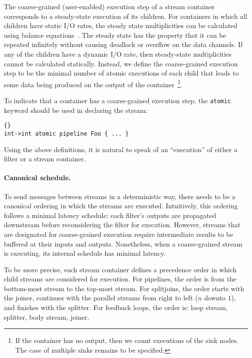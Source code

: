 The coarse-grained (user-enabled) execution step of a stream container
corresponds to a steady-state execution of its children.  For
containers in which all children have static I/O rates, the steady
state multiplicities can be calculated using balance
equations~\cite{LM87-i}.  The steady state has the property that it
can be repeated infinitely without causing deadlock or overflow on the
data channels.  If any of the children have a dynamic I/O rate, then
steady-state multiplicities cannot be calculated statically.  Instead,
we define the coarse-grained execution step to be the minimal number
of atomic executions of each child that leads to some data being
produced on the output of the container~\footnote{If the container has
no output, then we count executions of the sink nodes.  The case of
multiple sinks remains to be specified.}.

To indicate that a container has a coarse-grained execution step, the
{\tt atomic} keyword should be used in declaring the stream:

\begin{lstlisting}{}
int->int atomic pipeline Foo { ... }
\end{lstlisting}{}

Using the above definitions, it is natural to speak of an
``execution'' of either a filter or a stream container.

\paragraph{Canonical schedule.}

To send messages between streams in a deterministic way, there needs
to be a canonical ordering in which the streams are executed.
Intuitively, this ordering follows a minimal latency schedule: each
filter's outputs are propagated downstream before reconsidering the
filter for execution.  However, streams that are designated for
coarse-grained execution require intermediate results to be buffered
at their inputs and outputs.  Nonetheless, when a coarse-grained
stream is executing, its internal schedule has minimal latency.

To be more precise, each stream container defines a precedence order
in which child streams are considered for execution.  For pipelines,
the order is from the bottom-most stream to the top-most stream.  For
splitjoins, the order starts with the joiner, continues with the
parallel streams from right to left ($n$ downto $1$), and finishes
with the splitter.  For feedback loops, the order is: loop stream,
splitter, body stream, joiner.

